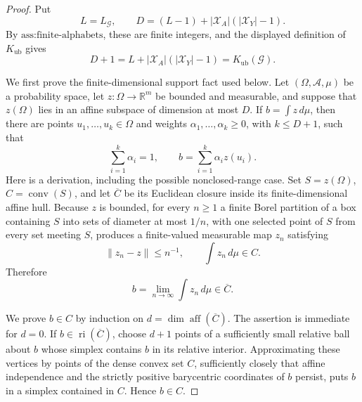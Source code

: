 \documentclass{article}
\begin{document}
\begin{proof}
Put
\[
L=L_{\mathcal G},
\qquad
D=(L-1)+|\mathcal X_A|(|\mathcal X_Y|-1).
\tag{1}
\]
By \(\text{ass:finite-alphabets}\), these are finite integers, and the displayed definition of \(K_{\mathrm{ub}}\) gives
\[
D+1=L+|\mathcal X_A|(|\mathcal X_Y|-1)
=K_{\mathrm{ub}}(\mathcal G).
\tag{2}
\]

We first prove the finite-dimensional support fact used below. Let \((\Omega,\mathcal A,\mu)\) be a probability space, let \(z:\Omega\to\mathbb R^m\) be bounded and measurable, and suppose that \(z(\Omega)\) lies in an affine subspace of dimension at most \(D\). If \(b=\int z\,d\mu\), then there are points \(u_1,\ldots,u_k\in\Omega\) and weights \(\alpha_1,\ldots,\alpha_k\geq0\), with \(k\leq D+1\), such that
\[
\sum_{i=1}^k\alpha_i=1,
\qquad
b=\sum_{i=1}^k\alpha_i z(u_i).
\tag{3}
\]
Here is a derivation, including the possible nonclosed-range case. Set \(S=z(\Omega)\), \(C=\operatorname{conv}(S)\), and let \(\overline C\) be its Euclidean closure inside its finite-dimensional affine hull. Because \(z\) is bounded, for every \(n\geq1\) a finite Borel partition of a box containing \(S\) into sets of diameter at most \(1/n\), with one selected point of \(S\) from every set meeting \(S\), produces a finite-valued measurable map \(z_n\) satisfying
\[
\|z_n-z\|\leq n^{-1},
\qquad
\int z_n\,d\mu\in C.
\]
Therefore
\[
b=\lim_{n\to\infty}\int z_n\,d\mu\in\overline C.
\tag{4}
\]

We prove \(b\in C\) by induction on \(d=\dim\operatorname{aff}(\overline C)\). The assertion is immediate for \(d=0\). If \(b\in\operatorname{ri}(\overline C)\), choose \(d+1\) points of a sufficiently small relative ball about \(b\) whose simplex contains \(b\) in its relative interior. Approximating these vertices by points of the dense convex set \(C\), sufficiently closely that affine independence and the strictly positive barycentric coordinates of \(b\) persist, puts \(b\) in a simplex contained in \(C\). Hence \(b\in C\).


\end{proof}
\end{document}
